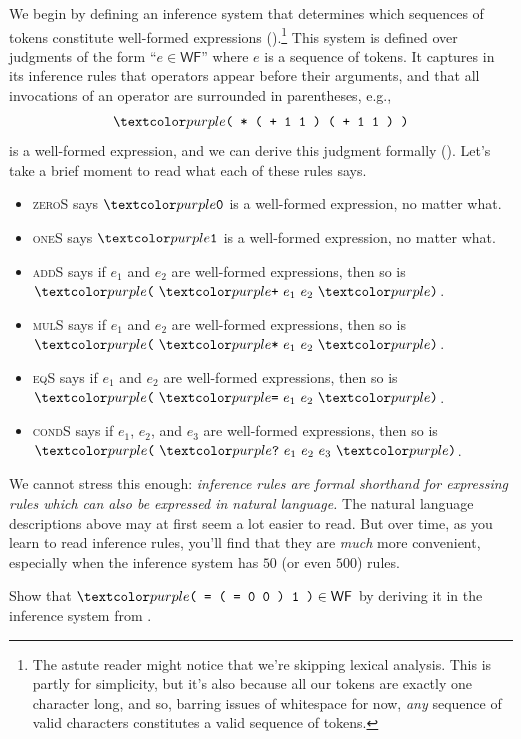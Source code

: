 We begin by defining an inference system that determines which sequences of tokens constitute well-formed expressions ().\footnote{The astute reader might notice that we're skipping lexical analysis. This is partly for simplicity, but it's also because all our tokens are exactly one character long, and so, barring issues of whitespace for now, \textit{any} sequence of valid characters constitutes a valid sequence of tokens.}
This system is defined over judgments of the form \enquote{$e \in \mathsf{WF}$} where $e$ is a sequence of tokens.
It captures in its inference rules that operators appear before their arguments, and that all invocations of an operator are surrounded in parentheses, e.g.,
\begin{align*}
  \codel{( * ( + 1 1 ) ( + 1 1 ) )}
\end{align*}
is a well-formed expression, and we can derive this judgment formally ().
Let’s take a brief moment to read what each of these rules says.
\begin{itemize}
\item \textsc{zeroS} says $\codel 0$ is a well-formed expression, no matter what.
\item \textsc{oneS} says $\codel 1$ is a well-formed expression, no matter what.
\item \textsc{addS} says if $e_1$ and $e_2$ are well-formed expressions, then so is $\codel( \ \codel+ \ e_1 \ e_2 \ \codel)$.
\item \textsc{mulS} says if $e_1$ and $e_2$ are well-formed expressions, then so is $\codel( \ \codel* \ e_1 \ e_2 \ \codel)$.
\item \textsc{eqS} says if $e_1$ and $e_2$ are well-formed expressions, then so is $\codel( \ \codel= \ e_1 \ e_2 \ \codel)$.
\item \textsc{condS} says if $e_1$, $e_2$, and $e_3$ are well-formed expressions, then so is $\codel( \ \codel ? \ e_1 \ e_2 \ e_3 \ \codel)$.
\end{itemize}
We cannot stress this enough: \textit{inference rules are formal shorthand for expressing rules which can also be expressed in natural language.}
The natural language descriptions above may at first seem a lot easier to read.
But over time, as you learn to read inference rules, you'll find that they are \textit{much} more convenient, especially when the inference system has $50$ (or even $500$) rules.
\begin{exercise}
  Show that $\codel{( = ( = 0 0 ) 1 )} \in \mathsf{WF}$ by deriving it in the inference system from .
\end{exercise}

